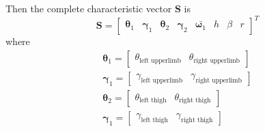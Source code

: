 \documentclass[12pt]{article}
\begin{document}
        Then the complete characteristic vector $\bm{S}$ is
        \begin{equation}
            \bm{S} = \begin{bmatrix}
                \bm{\theta}_1 & \bm{\gamma}_1 & \bm{\theta}_2 & \bm{\gamma}_2 & \bar{\bm{\omega}_1} & h & \beta & r
            \end{bmatrix}^T
        \end{equation}
        where
        \begin{gather}
            \bm{\theta}_1 = \begin{bmatrix}
                \theta_{\text{left upperlimb}} & \theta_{\text{right upperlimb}}
            \end{bmatrix} \\ \bm{\gamma}_1 = 
            \begin{bmatrix}
                \gamma_{\text{left upperlimb}} & \gamma_{\text{right upperlimb}}
            \end{bmatrix} \\
            \bm{\theta}_2 = \begin{bmatrix}
                \theta_{\text{left thigh}} & \theta_{\text{right thigh}}
            \end{bmatrix} \\ \bm{\gamma}_1 = 
            \begin{bmatrix}
                \gamma_{\text{left thigh}} & \gamma_{\text{right thigh}}
            \end{bmatrix}
        \end{gather}
\end{document}
